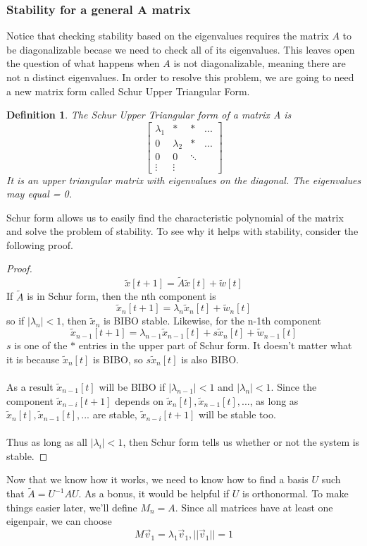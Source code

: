 \documentclass{article}
\newtheorem{definition}{Definition}
\newtheorem{proof}{Proof}
\begin{document}
\subsubsection{Stability for a general A matrix}
Notice that checking stability based on the eigenvalues requires the matrix $A$ to be diagonalizable becase we need to check all of its eigenvalues.
This leaves open the question of what happens when $A$ is not diagonalizable, meaning there are not n distinct eigenvalues.
In order to resolve this problem, we are going to need a new matrix form called Schur Upper Triangular Form.
\begin{definition}
    The Schur Upper Triangular form of a matrix A is
    \[
        \left[
            \begin{array}{cccc}
                \lambda_1 & * & * & ... \\
                0 & \lambda_2 & * & ... \\
                0 & 0 & \ddots & \\
                \vdots & \vdots &  & 
            \end{array}
        \right]
        \]
    It is an upper triangular matrix with eigenvalues on the diagonal. The eigenvalues may equal = 0.
\end{definition}
Schur form allows us to easily find the characteristic polynomial of the matrix and solve the problem of stability.
To see why it helps with stability, consider the following proof.
\begin{proof}
    $$\tilde{x}[t+1]=\tilde{A}\tilde{x}[t]+\tilde{w}[t]$$
    If $\tilde{A}$ is in Schur form, then the nth component is
    $$\tilde{x}_n[t+1]=\lambda_n\tilde{x}_n[t]+\tilde{w}_n[t]$$
    so if $|\lambda_n| < 1$, then $\tilde{x}_n$ is BIBO stable.
    Likewise, for the n-1th component
    $$\tilde{x}_{n-1}[t+1]=\lambda_{n-1}\tilde{x}_{n-1}[t]+s\tilde{x}_n[t]+\tilde{w}_{n-1}[t]$$
    $s$ is one of the $*$ entries in the upper part of Schur form. It doesn't matter what it is because $\tilde{x}_n[t]$ is BIBO, so $s\tilde{x}_n[t]$ is also BIBO.
    \\\\As a result $\tilde{x}_{n-1}[t]$ will be BIBO if $|\lambda_{n-1}|<1$ and $|\lambda_n| < 1$.
    Since the component $\tilde{x}_{n-i}[t+1]$ depends on $\tilde{x}_n[t], \tilde{x}_{n-1}[t],...$, as long as $\tilde{x}_n[t], \tilde{x}_{n-1}[t],...$ are stable, $\tilde{x}_{n-i}[t+1]$ will be stable too.
    \\\\Thus as long as all $|\lambda_i|<1$, then Schur form tells us whether or not the system is stable.
\end{proof}
Now that we know how it works, we need to know how to find a basis $U$ such that $\tilde{A}=U^{-1}AU$. As a bonus, it would be helpful if $U$ is orthonormal.
To make things easier later, we'll define $M_n = A$. Since all matrices have at least one eigenpair, we can choose
$$M\vec{v}_1=\lambda_1\vec{v}_1, ||\vec{v}_1||=1$$
\end{document}
